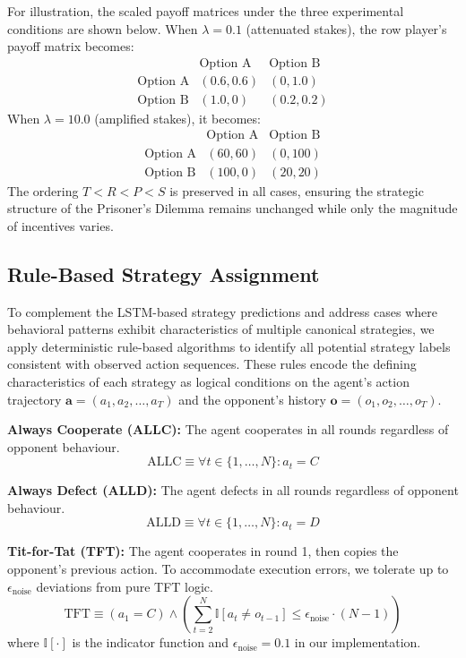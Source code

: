 \documentclass{article}
\begin{document}
For illustration, the scaled payoff matrices under the three experimental conditions are shown below. When $\lambda = 0.1$ (attenuated stakes), the row player's payoff matrix becomes:
\[
\begin{array}{c|cc}
 & \text{Option A} & \text{Option B} \\
\hline
\text{Option A} & (0.6, 0.6) & (0, 1.0) \\
\text{Option B} & (1.0, 0) &  (0.2, 0.2)
\end{array}
\]
When $\lambda = 10.0$ (amplified stakes), it becomes:
\[
\begin{array}{c|cc}
 & \text{Option A} & \text{Option B} \\
\hline
\text{Option A} & (60, 60) & (0, 100) \\
\text{Option B} & (100, 0) & (20, 20)
\end{array}
\]
The ordering $T < R < P < S$ is preserved in all cases, ensuring the strategic structure of the Prisoner's Dilemma remains unchanged while only the magnitude of incentives varies.

\subsection{Rule-Based Strategy Assignment}
\label{appendix:rule_based}

To complement the LSTM-based strategy predictions and address cases where behavioral patterns exhibit characteristics of multiple canonical strategies, we apply deterministic rule-based algorithms to identify all potential strategy labels consistent with observed action sequences. These rules encode the defining characteristics of each strategy as logical conditions on the agent's action trajectory $\mathbf{a} = (a_1, a_2, \ldots, a_T)$ and the opponent's history $\mathbf{o} = (o_1, o_2, \ldots, o_T)$.

\textbf{Always Cooperate (ALLC):} The agent cooperates in all rounds regardless of opponent behaviour.
\[
\text{ALLC} \equiv \forall t \in \{1, \ldots, N\}: a_t = C
\]

\textbf{Always Defect (ALLD):} The agent defects in all rounds regardless of opponent behaviour.
\[
\text{ALLD} \equiv \forall t \in \{1, \ldots, N\}: a_t = D
\]

\textbf{Tit-for-Tat (TFT):} The agent cooperates in round 1, then copies the opponent's previous action. To accommodate execution errors, we tolerate up to $\epsilon_{\text{noise}}$ deviations from pure TFT logic.
\[
\text{TFT} \equiv (a_1 = C) \land \left(\sum_{t=2}^{N} \mathbb{I}[a_t \neq o_{t-1}] \leq \epsilon_{\text{noise}} \cdot (N-1)\right)
\]
where $\mathbb{I}[\cdot]$ is the indicator function and $\epsilon_{\text{noise}} = 0.1$ in our implementation.
\end{document}
